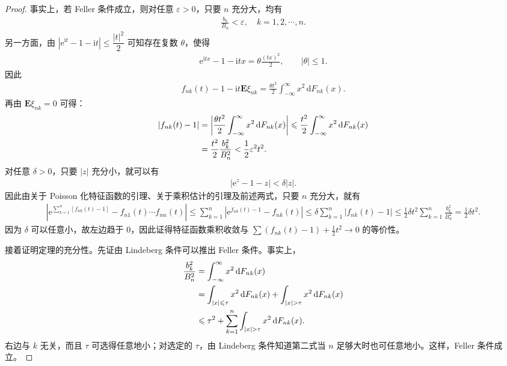 \documentclass[../../main.tex]{subfiles}
\begin{document}
\begin{proof}
事实上，若 Feller 条件成立，则对任意 $\varepsilon>0$，只要 $n$ 充分大，均有
\begin{align*}
\frac{b_k}{B_n}<\varepsilon,\quad k=1,2,\cdots,n.
\end{align*}
另一方面，由 $|\mathrm{e}^{\mathrm{i}t}-1-\mathrm{i}t|\leqslant\dfrac{|t|^{2}}2$ 可知存在复数 $\theta$，使得
\begin{align}
\mathrm{e}^{\mathrm{i}tx}-1-\mathrm{i}tx=\theta\frac{(tx)^{2}}2,\qquad|\theta|\leqslant1.
\end{align}
因此
\begin{align*}
f_{nk}(t)-1-\mathrm{i}t\boldsymbol{E}\xi_{nk}=\frac{\theta t^{2}}2\int_{-\infty}^{\infty}x^{2}\,\mathrm{d}F_{nk}(x).
\end{align*}
再由 $\boldsymbol{E}\xi_{nk}=0$ 可得：
\begin{align}
|f_{nk}(t)-1|&=\left|\frac{\theta t^{2}}2\int_{-\infty}^{\infty}x^{2}\,\mathrm{d}F_{nk}(x)\right|\leqslant\frac{t^{2}}2\int_{-\infty}^{\infty}x^{2}\,\mathrm{d}F_{nk}(x)\notag\\
&=\frac{t^{2}}2\frac{b_k^{2}}{B_n^{2}}<\frac12\varepsilon^{2}t^{2}.
\end{align}
对任意 $\delta>0$，只要 $|z|$ 充分小，就可以有
\begin{align}
|\mathrm{e}^{z}-1-z|<\delta|z|.
\end{align}
因此由关于 Poisson 化特征函数的引理、关于乘积估计的引理及前述两式，只要 $n$ 充分大，就有
\begin{align}
\left|\mathrm{e}^{\sum_{k=1}^{n}[f_{nk}(t)-1]}-f_{n1}(t)\cdots f_{nn}(t)\right|
\leqslant\sum_{k=1}^{n}\left|\mathrm{e}^{f_{nk}(t)-1}-f_{nk}(t)\right|
\leqslant\delta\sum_{k=1}^{n}|f_{nk}(t)-1|
\leqslant\frac12\delta t^{2}\sum_{k=1}^{n}\frac{b_k^{2}}{B_n^{2}}=\frac12\delta t^{2}.
\end{align}
因为 $\delta$ 可以任意小，故左边趋于 $0$，因此证得特征函数乘积收敛与 $\sum(f_{nk}(t)-1)+\frac12t^{2}\to0$ 的等价性。

接着证明定理的充分性。先证由 Lindeberg 条件可以推出 Feller 条件。事实上，
\begin{align}
\frac{b_k^{2}}{B_n^{2}}&=\int_{-\infty}^{\infty}x^{2}\,\mathrm{d}F_{nk}(x)\notag\\
&=\int_{|x|\leqslant\tau}x^{2}\,\mathrm{d}F_{nk}(x)+\int_{|x|>\tau}x^{2}\,\mathrm{d}F_{nk}(x)\notag\\
&\leqslant\tau^{2}+\sum_{k=1}^{n}\int_{|x|>\tau}x^{2}\,\mathrm{d}F_{nk}(x).
\end{align}
右边与 $k$ 无关，而且 $\tau$ 可选得任意地小；对选定的 $\tau$，由 Lindeberg 条件知道第二式当 $n$ 足够大时也可任意地小。这样，Feller 条件成立。


\end{proof}
\end{document}
